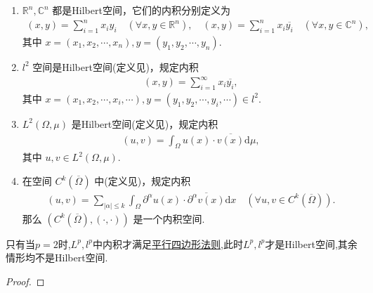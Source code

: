 \documentclass[../../main.tex]{subfiles}%
\begin{document}
\begin{proposition}
\begin{enumerate}[(1)]
\item $\mathbb{R}^n,\mathbb{C}^n$ 都是Hilbert空间，它们的内积分别定义为
\begin{align*}
(x,y)=\sum\limits_{i=1}^n x_iy_i\quad(\forall x,y\in\mathbb{R}^n),
\quad
(x,y)=\sum\limits_{i=1}^n x_i\overline{y_i}\quad(\forall x,y\in\mathbb{C}^n),
\end{align*}
其中 $x=(x_1,x_2,\cdots,x_n),y=(y_1,y_2,\cdots,y_n)$.

\item $l^2$ 空间是Hilbert空间(定义见)，规定内积
\begin{align*}
(x,y)=\sum\limits_{i=1}^\infty x_i\overline{y_i},
\end{align*}
其中 $x=(x_1,x_2,\cdots,x_i,\cdots),y=(y_1,y_2,\cdots,y_i,\cdots)\in l^2$.

\item $L^2(\Omega,\mu)$ 是Hilbert空间(定义见)，规定内积
\begin{align*}
(u,v)=\int_\Omega u(x)\cdot\overline{v(x)}\mathrm{d}\mu,
\end{align*}
其中 $u,v\in L^2(\Omega,\mu)$.

\item 在空间 $C^k(\overline{\Omega})$ 中(定义见)，规定内积
\begin{align*}
(u,v)=\sum\limits_{|\alpha|\leqslant k}\int_\Omega \partial^\alpha u(x)\cdot\overline{\partial^\alpha v(x)}\mathrm{d}x\quad(\forall u,v\in C^k(\overline{\Omega})).
\end{align*}
那么 $(C^k(\overline{\Omega}),(\cdot,\cdot))$ 是一个内积空间.
\end{enumerate}
\end{proposition}
\begin{remark}
只有当$p=2$时,$L^p,l^p$中内积才满足\hyperref[proposition:平行四边形等式--泛函分析]{平行四边形法则},此时$L^p,l^p$才是Hilbert空间,其余情形均不是Hilbert空间.
\end{remark}
\begin{proof}
\end{proof}
\end{document}
